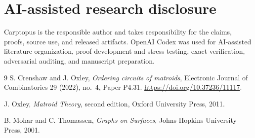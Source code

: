 \documentclass[11pt]{article}
\begin{document}
\section*{AI-assisted research disclosure}

Carptopus is the responsible author and takes responsibility for the claims,
proofs, source use, and released artifacts. OpenAI Codex was used for
AI-assisted literature organization, proof development and stress testing,
exact verification, adversarial auditing, and manuscript preparation.

\begin{thebibliography}{9}
S. Crenshaw and J. Oxley,
\emph{Ordering circuits of matroids},
Electronic Journal of Combinatorics 29 (2022), no.~4, Paper P4.31.
\url{https://doi.org/10.37236/11117}.

J. Oxley,
\emph{Matroid Theory}, second edition,
Oxford University Press, 2011.

B. Mohar and C. Thomassen,
\emph{Graphs on Surfaces},
Johns Hopkins University Press, 2001.
\end{thebibliography}
\end{document}
